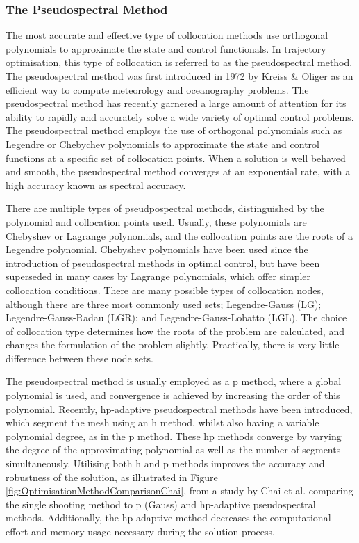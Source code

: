 \subsubsection{The Pseudospectral Method}\label{sec:PS}


The most accurate and effective type of collocation methods use orthogonal polynomials to approximate the state and control functionals\cite{Fahroo2000}. In trajectory optimisation, this type of collocation is referred to as the pseudospectral method\cite{Kelly2015}. 
The pseudospectral method was first introduced in 1972 by Kreiss \& Oliger\cite{Kreiss1972} as an efficient way to compute meteorology and oceanography problems. The pseudospectral method has recently garnered a large amount of attention for its ability to rapidly and accurately solve a wide variety of optimal control problems. The pseudospectral method employs the use of orthogonal polynomials such as Legendre or Chebychev polynomials to approximate the state and control functions at a specific set of collocation points\cite{Fahroo2000,Huntington2007,Kelly2015,Rao2009}.
 When a solution is well behaved and smooth, the pseudospectral method converges at an exponential rate, with a high accuracy known as spectral accuracy\cite{Ross2004,Darby2011a}. 
 
 There are multiple types of pseudpospectral methods, distinguished by the polynomial and collocation points used. Usually, these polynomials are Chebyshev or Lagrange polynomials\cite{Fahroo2000,Rao2009}, and the collocation points are the roots of a Legendre polynomial\cite{Garg2009}. Chebyshev polynomials have been used since the introduction of pseudospectral methods in optimal control, but have been superseded in many cases by Lagrange polynomials, which offer simpler collocation conditions\cite{Rao2009}. 
 There are many possible types of collocation nodes, although there are three most commonly used sets; Legendre-Gauss (LG); Legendre-Gauss-Radau (LGR); and Legendre-Gauss-Lobatto (LGL)\cite{Garg2009,Rao2009}. The choice of collocation type determines how the roots of the problem are calculated, and changes the formulation of the problem slightly\cite{Garg2009}. Practically, there is very little difference between these node sets\cite{Garg2009}.
 
 
 The pseudospectral method is usually employed as a \textsf{p} method, where a global polynomial is used, and convergence is achieved by increasing the order of this polynomial\cite{Rao2009}. Recently, hp-adaptive pseudospectral methods have been introduced, which segment the mesh using an h method, whilst also having a variable polynomial degree, as in the \textsf{p} method\cite{Darby2011a}. These hp methods converge by varying the degree of the approximating polynomial as well as the number of segments simultaneously. Utilising both \textsf{h} and \textsf{p} methods improves the accuracy and robustness of the solution, as illustrated in Figure \ref{fig:OptimisationMethodComparisonChai}, from a study by Chai et al.\cite{Chai2015} comparing the single shooting method to \textsf{p} (Gauss) and \textsf{hp}-adaptive pseudospectral methods. Additionally, the \textsf{hp}-adaptive method decreases the computational effort and memory usage necessary during the solution process\cite{Darby2011a,Chai2015}. 


